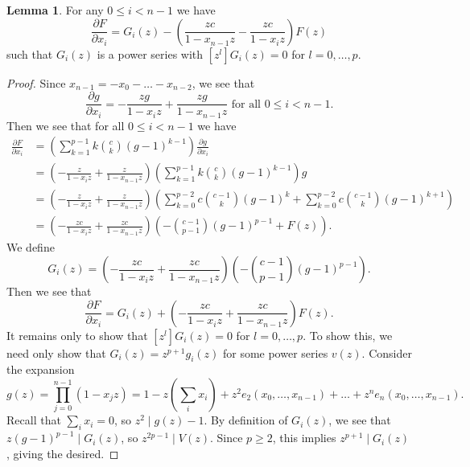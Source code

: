 \documentclass{amsart}
\numberwithin{equation}{section}
\theoremstyle{definition}
\newtheorem{lemma}[theorem]{Lemma}
\begin{document}
\begin{lemma}\label{lem:dFdxi} For any $0 \le i < n-1$ we have 
\[
\frac{\partial F}{\partial x_i} = G_i(z) - \left(\frac{zc}{1-x_{n-1}z}-\frac{zc}{1-x_iz}\right)F(z)
\]
such that $G_i(z)$ is a power series with $[z^l]G_i(z)=0$ for $l=0,\dots,p$. 
\end{lemma}

\begin{proof}

Since $x_{n-1}=-x_0-\dots-x_{n-2}$, we see that
\[
\frac{\partial g}{\partial x_i}=-\frac{zg}{1-x_iz}+\frac{zg}{1-x_{n-1}z} \text{ for all $0 \le i < n-1$}.
\]
Then we see that for all $0 \le i < n-1$ we have 
\begin{align*}
\frac{\partial F}{\partial x_i}%
&=\left(\sum_{k=1}^{p-1}k\binom{c}{k}(g-1)^{k-1}\right)\frac{\partial g}{\partial x_i}\\
&=\left(-\frac{z}{1-x_iz}+\frac{z}{1-x_{n-1}z}\right)\left(\sum_{k=1}^{p-1}k\binom{c}{k}(g-1)^{k-1}\right)g\\
&=\left(-\frac{z}{1-x_iz}+\frac{z}{1-x_{n-1}z}\right)\left(\sum_{k=0}^{p-2}c\binom{c-1}{k}(g-1)^{k}+\sum_{k=0}^{p-2}c\binom{c-1}{k}(g-1)^{k+1}\right)\\
&=\left(-\frac{zc}{1-x_iz}+\frac{zc}{1-x_{n-1}z}\right)\left(-\binom{c-1}{p-1}(g-1)^{p-1}+F(z)\right).
\end{align*}
We define
\[
G_i(z)=\left(-\frac{zc}{1-x_iz}+\frac{zc}{1-x_{n-1}z}\right)\left(-\binom{c-1}{p-1}(g-1)^{p-1}\right).
\]
Then we see that
\[
\frac{\partial F}{\partial x_i}=G_i(z)+\left(-\frac{zc}{1-x_iz}+\frac{zc}{1-x_{n-1}z}\right)F(z).
\]
It remains only to show that $[z^l]G_i(z)=0$ for $l=0,\dots,p$. To show this, we need only show that $G_i(z)=z^{p+1}g_i(z)$ for some power series $v(z)$.  Consider the expansion 
\[
g(z)=\prod_{j=0}^{n-1} (1-x_jz) = 1-z\left(\sum_i x_i\right)+z^2e_2(x_0, \ldots, x_{n-1})+\dots+z^ne_n(x_0, \ldots, x_{n - 1}).
\]
Recall that $\sum_i x_i = 0$, so $z^2 \mid g(z)-1$.  By definition of $G_i(z)$, we see that $z(g-1)^{p-1} \mid G_i(z)$, so $z^{2p-1} \mid V(z)$. Since $p \ge 2$, this implies $z^{p+1} \mid G_i(z)$, giving the desired.
\end{proof}
\end{document}
